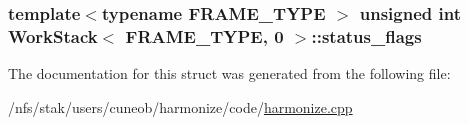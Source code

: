 \hypertarget{structWorkStack_3_01FRAME__TYPE_00_010_01_4_a541f97342c2d933c880b73c7003305eb}{
\subsubsection[{status\-\_\-flags}]{\setlength{\rightskip}{0pt plus 5cm}template$<$typename F\-R\-A\-M\-E\-\_\-\-T\-Y\-P\-E $>$ unsigned int {\bf Work\-Stack}$<$ F\-R\-A\-M\-E\-\_\-\-T\-Y\-P\-E, 0 $>$\-::status\-\_\-flags}}\label{structWorkStack_3_01FRAME__TYPE_00_010_01_4_a541f97342c2d933c880b73c7003305eb}


The documentation for this struct was generated from the following file\-:\begin{DoxyCompactItemize}
\item 
/nfs/stak/users/cuneob/harmonize/code/\hyperlink{harmonize_8cpp}{harmonize.\-cpp}\end{DoxyCompactItemize}
